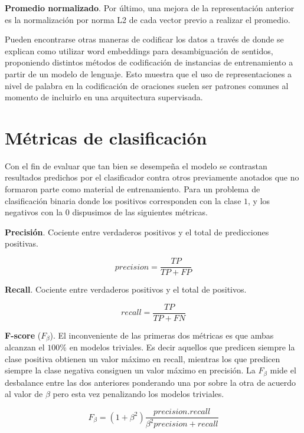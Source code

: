 \textbf{Promedio normalizado}. Por último, una mejora de la representación
anterior es la normalización por norma L2 de cada vector previo a realizar el
promedio.

Pueden encontrarse otras maneras de codificar los datos a través de
\citep{Iacobacci-2016} donde se explican como utilizar word embeddings para
desambiguación de sentidos, proponiendo distintos métodos de codificación de
instancias de entrenamiento a partir de un modelo de lenguaje. Esto muestra que
el uso de representaciones a nivel de palabra en la codificación de oraciones
suelen ser patrones comunes al momento de incluirlo en una arquitectura
supervisada.

\section{Métricas de clasificación}
\label{lit:metrics}

Con el fin de evaluar que tan bien se desempeña el modelo se contrastan
resultados predichos por el clasificador contra otros previamente anotados que
no formaron parte como material de entrenamiento. Para un problema de
clasificación binaria donde los positivos corresponden con la clase $1$, y los
negativos con la $0$ dispusimos de las siguientes métricas.

\textbf{Precisión}. Cociente entre verdaderos positivos y el total de
predicciones positivas. 

\begin{equation}
    precision = \frac{TP}{TP + FP}
\end{equation}

\textbf{Recall}. Cociente entre verdaderos positivos y el total de positivos.

\begin{equation}
    recall = \frac{TP}{TP + FN}
\end{equation}

\textbf{F-score} ($F_{\beta}$). El inconveniente de las primeras dos métricas es
que ambas alcanzan el $100\%$ en modelos triviales. Es decir aquellos que
predicen siempre la clase positiva obtienen un valor máximo en recall, mientras
los que predicen siempre la clase negativa consiguen un valor máximo en
precisión. La $F_{\beta}$ mide el desbalance entre las dos anteriores ponderando
una por sobre la otra de acuerdo al valor de $\beta$ pero esta vez penalizando
los modelos triviales. 

\begin{equation}
    F_{\beta} = (1 + \beta^2) \frac{precision . recall}{\beta^2 precision + recall}
\end{equation}

